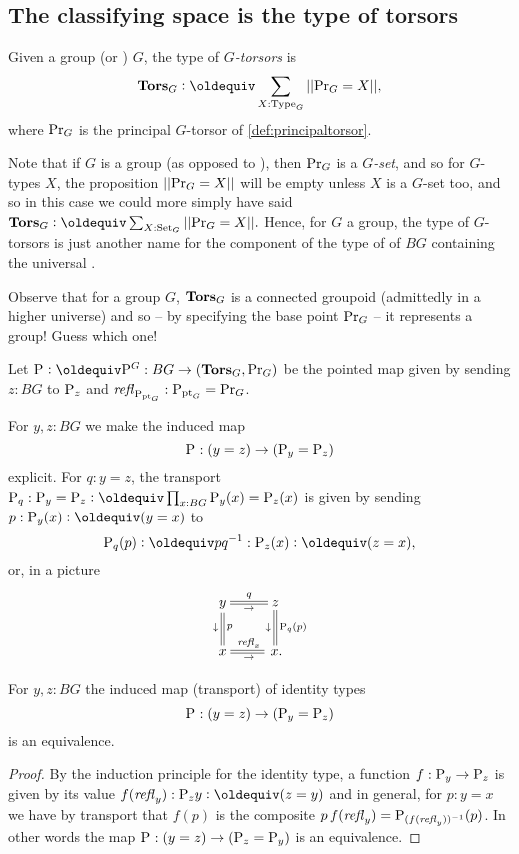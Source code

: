 \subsection{The classifying space is the type of torsors}
\label{sec:torsors}
\begin{definition}
  Given a group (or \inftygp) $G$, the type of {\em$G$-torsors} is
$$\typetorsor_G\defequi\sum_{X:\Type_G}||\princ G=X||,$$
where $\mathrm{Pr}_{{G}}$ is the principal $G$-torsor of \cref{def:principaltorsor}.
\end{definition}
\begin{remark}
  Note that if $G$ is a group (as opposed to \aninftygp), then $\mathrm{Pr}_{{G}}$ is a $G${\em-set}, and so for $G$-types $X$, the proposition $||\mathrm{Pr}_{{G}}=X||$ will be empty unless $X$ is a $G$-set too, and so in this case we could more simply have said $\typetorsor_G\defequi\sum_{X:\Set_G}||\princ G=X||.$  
Hence, for $G$ a group, the type of $G$-torsors is just another name for the component of the type of \coverings of $BG$ containing the universal \covering.

Observe that for a group $G$, $\mathbf{Tors}_G$ is a connected groupoid (admittedly in a higher universe) and so -- by specifying the base point $\mathrm{Pr}_{{G}}$ -- it represents a group!  Guess which one!
\end{remark}
\begin{definition}
  \label{def:BG2TorsG}
  Let $\pathsp{}\defequi\pathsp{}^G:BG\to(\typetorsor_G,\princ G)$ be the pointed map given by sending $z:BG$ to $\mathrm{P}_{z}$ and $\mathop{{\it refl}_{\mathrm{P}_{{\mathord{\mathrm{pt}}}_G}}}:\mathrm{P}_{{\mathord{\mathrm{pt}}}_G}=\mathrm{Pr}_{{G}}$. 
\end{definition}

\begin{example}\label{ex:pathsptransport}
  For $y,z:BG$ we make the induced map
$$\mathrm{P}_{}:(y=z)\to (\mathrm{P}_{y}=\mathrm{P}_{z})
$$
explicit.  For $q:y=z$,  the transport $\pathsp q:\pathsp y=\pathsp z\defequi\prod_{x:BG}\pathsp y(x)=\pathsp z(x)$ is given by sending $p:\pathsp y(x)\defequi (y=x)$ to
$$\pathsp q(p)\defequi pq^{-1}:\pathsp z(x)\defequi(z=x),$$ 
or, in a picture 
$$\xymatrix{y\ar@{=}[r]^q_\to\ar@{=}[d]^{p}_\downarrow&z\ar@{=}[d]^{\pathsp q(p)}_\downarrow\\
x\ar@{=}[r]^{\refl x}_\to&\,x.}$$
\end{example}
\begin{lemma}\label{lem:pathsptransportiseq}
  For  $y,z:BG$ the induced map  (\ie transport) of identity types
$$\mathrm{P}_{}:(y=z)\to (\mathrm{P}_{y}=\mathrm{P}_{z})
$$
is an equivalence.
\end{lemma}
\begin{proof}
 By the induction principle for the identity type,  
a function $f:\mathrm{P}_{y}\to \mathrm{P}_{z}$ is given by its value $f(\refl y):\pathsp zy\defequi (z=y)$ and in general, for $p:y= x$ we have by transport that $f(p)$ is the composite $p\,f(\mathop{{\it refl}_{y}})=\mathrm{P}_{(f(\mathop{{\it refl}_{y}}))^{-1}}(p)$.  
In other words the map $\mathrm{P}_{}:(y=z)\to(\mathrm{P}_{z}=\mathrm{P}_{y})$ is an equivalence.
\end{proof}


